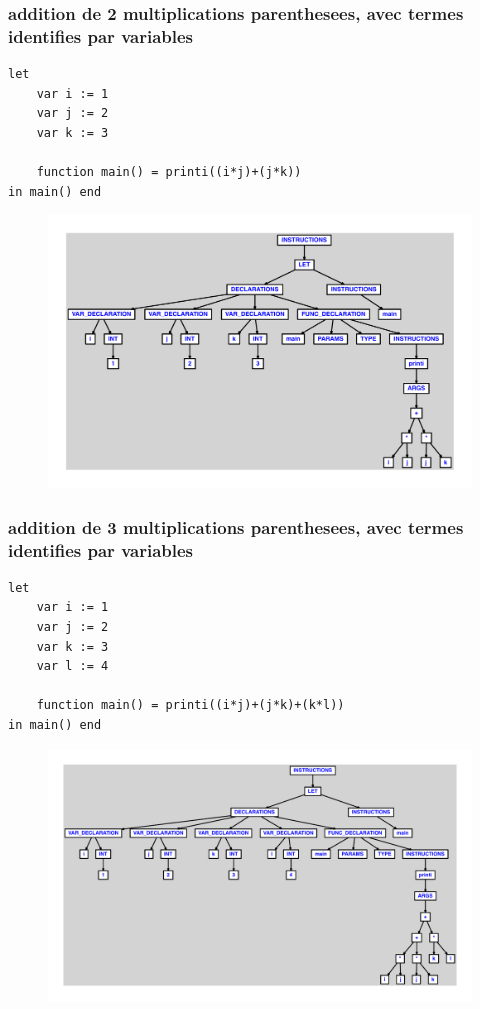 \documentclass{article}
\begin{document}
\subsubsection{addition de 2 multiplications parenthesees, avec termes identifies par variables}
\begin{lstlisting}
let
	var i := 1
	var j := 2
	var k := 3

	function main() = printi((i*j)+(j*k))
in main() end
\end{lstlisting}
\newpage
\begin{figure}[H]
\centering
\includegraphics[max width=\textwidth]{ast/ast_131.pdf}
\end{figure}
\newpage
\subsubsection{addition de 3 multiplications parenthesees, avec termes identifies par variables}
\begin{lstlisting}
let
	var i := 1
	var j := 2
	var k := 3
	var l := 4

	function main() = printi((i*j)+(j*k)+(k*l))
in main() end
\end{lstlisting}
\newpage
\begin{figure}[H]
\centering
\includegraphics[max width=\textwidth]{ast/ast_132.pdf}
\end{figure}
\newpage
\end{document}
